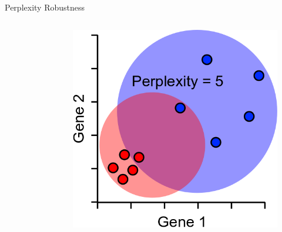 \begin{frame}[allowframebreaks]{Perplexity Robustness}
\begin{columns}
\begin{column}{0.33\textwidth}
\begin{figure}
        \end{figure}
    \end{column}
    \begin{column}{0.33\textwidth}
        \begin{figure}
            \centering
            \includegraphics[width=1\textwidth,keepaspectratio]{images/dul/dim-reduce/slide_29_3_img.png}
        \end{figure}
    \end{column}
    \end{columns}
\end{frame}

